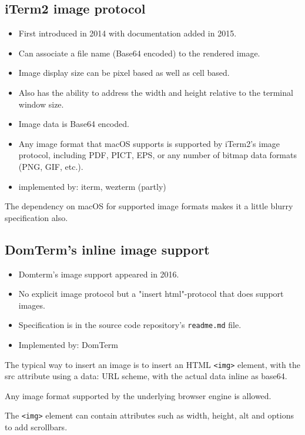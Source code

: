 \documentclass[a4paper]{article}
\begin{document}
\subsection{iTerm2 image protocol}

\begin{itemize}
    \item First introduced in 2014 with documentation added in 2015.
    \item Can associate a file name (Base64 encoded) to the rendered image.
    \item Image display size can be pixel based as well as cell based.
    \item Also has the ability to address the width and height relative to the terminal window size.
    \item Image data is Base64 encoded.
    \item Any image format that macOS supports is supported by iTerm2's image protocol,
        including PDF, PICT, EPS, or any number of bitmap data formats (PNG, GIF, etc.).
    \item implemented by: iterm, wezterm (partly)
\end{itemize}

The dependency on macOS for supported image formats makes it a little blurry
specification also.

\subsection{DomTerm's inline image support}

\begin{itemize}
    \item Domterm's image support appeared in 2016.
    \item No explicit image protocol but a "insert html"-protocol that does support images.
    \item Specification is in the source code repository's \texttt{readme.md} file.
    \item Implemented by: DomTerm
\end{itemize}

The typical way to insert an image is to insert an HTML \texttt{<img>} element,
with the src attribute using a data: URL scheme,
with the actual data inline as base64.

Any image format supported by the underlying browser engine is allowed.

The \texttt{<img>} element can contain attributes such as width, height, alt
and options to add scrollbars.
\end{document}
